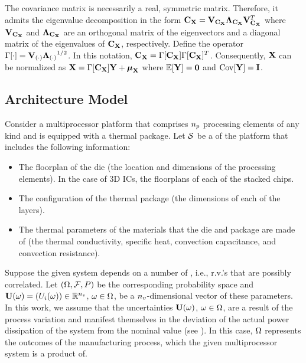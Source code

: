 The covariance matrix is necessarily a real, symmetric matrix. Therefore, it admits the eigenvalue decomposition \cite{press2007} in the form $\mCov_\mrv{x} = \m{V}_{\mCov_\mrv{x}} \m{\Lambda}_{\mCov_\mrv{x}} \m{V}_{\mCov_\mrv{x}}^T$ where $\m{V}_{\mCov_\mrv{x}}$ and $\m{\Lambda}_{\mCov_\mrv{x}}$ are an orthogonal matrix of the eigenvectors and a diagonal matrix of the eigenvalues of $\mCov_\mrv{x}$, respectively. Define the operator $\oEigen{\cd} = \m{V}_{(\cd)} {\m{\Lambda}_{(\cd)}}^{1/2}$. In this notation, $\mCov_\mrv{x} = \oEigen{\mCov_\mrv{x}} \oEigen{\mCov_\mrv{x}}^T$. Consequently, $\mrv{x}$ can be normalized as $\mrv{x} = \oEigen{\mCov_\mrv{x}} \mrv{y} + \vExp_\mrv{x}$ where $\oExp{\mrv{y}} = \mZ$ and $\oCov{\mrv{y}} = \mI$.

\subsection{Architecture Model} 
Consider a multiprocessor platform that comprises ${n_p}$ processing elements of any kind and is equipped with a thermal package. Let $\mathcal{S}$ be a  of the platform that includes the following information:
\begin{itemize}
  \item The floorplan of the die (the location and dimensions of the processing elements). In the case of 3D ICs, the floorplans of each of the stacked chips.
  \item The configuration of the thermal package (the dimensions of each of the layers).
  \item The thermal parameters of the materials that the die and package are made of (the thermal conductivity, specific heat, convection capacitance, and convection resistance).
\end{itemize}

Suppose the given system depends on a number of , i.e., r.v.'s that are possibly correlated. Let $(\Omega, \mathcal{F}, P)$ be the corresponding probability space and $\vU(\o) = \vec{\param_i(\o)} \in \real^\params$, $\omega \in \Omega$, be a ${n_v}$-dimensional vector of these parameters. In this work, we assume that the uncertainties $\vU(\o)$, $\omega \in \Omega$, are a result of the process variation and manifest themselves in the deviation of the actual power dissipation of the system from the nominal value (see ). In this case, $\Omega$ represents the outcomes of the manufacturing process, which the given multiprocessor system is a product of.

